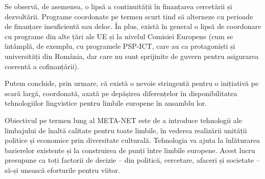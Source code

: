 \begin{multicols}{2}
Se observă, de asemenea, o lipsă a continuității în finanțarea cercetării și dezvoltării. Programe coordonate pe termen scurt tind să alterneze cu perioade de finanțare insuficientă sau deloc. În plus, există în general o lipsă de coordonare cu programe din alte țări ale UE și la nivelul Comisiei Europene (cum se întâmplă, de exemplu, cu programele PSP-ICT, care au ca protagoniști și universități din România, dar care nu sunt sprijinite de guvern pentru asigurarea coerentă a cofinanțării).

Putem conchide, prin urmare, că există o nevoie stringentă pentru o inițiativă pe scară largă, coordonată, axată pe depășirea diferențelor în disponibilitatea tehnologiilor lingvistice pentru limbile europene în ansamblu lor.

Obiectivul pe termen lung al META-NET este de a introduce tehnologii ale limbajului de înaltă calitate pentru toate limbile, în vederea realizării unității politice și economice prin diversitate culturală. Tehnologia va ajuta la înlăturarea barierelor existente și la construirea de punți între limbile europene. Acest lucru presupune ca toți factorii de decizie -- din politică, cercetare, afaceri și societate -- să-și unească eforturile pentru viitor.

\end{multicols}

\clearpage

